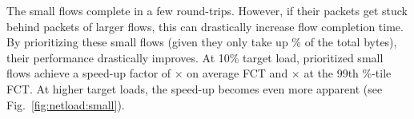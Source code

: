 %
%
%
%
%
%
%
%
%
%
%
%
%
%
%
%

 The small flows complete in a few round-trips. However, if their packets get stuck behind packets of larger flows, this can drastically increase flow completion time. By prioritizing these small flows (given they only take up \% of the total bytes), their performance drastically improves. At 10\% target load, prioritized small flows achieve a speed-up factor of $\times$ on average FCT and $\times$ at the 99th \%-tile FCT. At higher target loads, the speed-up becomes even more apparent (see Fig.~\ref{fig:netload:small}).

